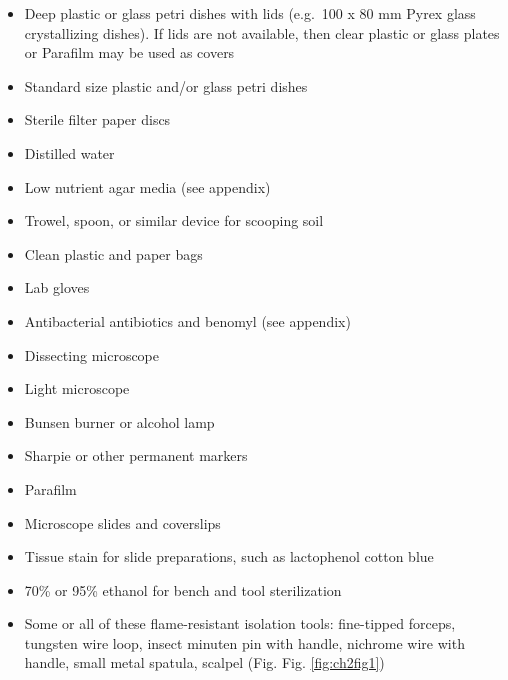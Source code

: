 \documentclass[]{book}
\providecommand{\tightlist}{%
  \setlength{\itemsep}{0pt}\setlength{\parskip}{0pt}}
\begin{document}
\begin{itemize}
\tightlist
\item
  Deep plastic or glass petri dishes with lids (e.g.~100 x 80 mm Pyrex glass crystallizing dishes). If lids are not available, then clear plastic or glass plates or Parafilm may be used as covers
\item
  Standard size plastic and/or glass petri dishes
\item
  Sterile filter paper discs
\item
  Distilled water
\item
  Low nutrient agar media (see appendix)
\item
  Trowel, spoon, or similar device for scooping soil
\item
  Clean plastic and paper bags
\item
  Lab gloves
\item
  Antibacterial antibiotics and benomyl (see appendix)
\item
  Dissecting microscope
\item
  Light microscope
\item
  Bunsen burner or alcohol lamp
\item
  Sharpie or other permanent markers
\item
  Parafilm
\item
  Microscope slides and coverslips
\item
  Tissue stain for slide preparations, such as lactophenol cotton blue
\item
  70\% or 95\% ethanol for bench and tool sterilization
\item
  Some or all of these flame-resistant isolation tools: fine-tipped forceps, tungsten wire loop, insect minuten pin with handle, nichrome wire with handle, small metal spatula, scalpel (Fig. Fig. \ref{fig:ch2fig1})
\end{itemize}
\end{document}
